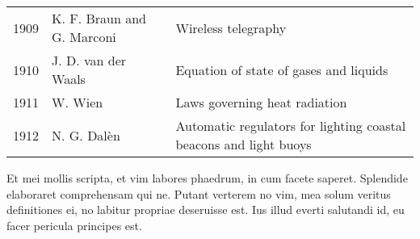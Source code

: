 \begin{landscape}
\begin{table}[hbt]
\begin{center}
\begin{tabular}{p{0.40in}p{2.30in}p{4.85in}}
        1909 & K. F. Braun and G. Marconi  & Wireless telegraphy\\
        1910 & J. D. van der Waals         & Equation of state of gases and liquids\\
        1911 & W. Wien                     & Laws governing heat radiation\\
        1912 & N. G. Dal\`{e}n             & Automatic regulators for lighting coastal beacons and light buoys\\
        \hline
      \end{tabular}
      \label{CHAPTER3_TABLE02}
    \end{center}
  \end{table}
\end{landscape}

Et mei mollis scripta, et vim labores phaedrum, in cum facete saperet. 
Splendide elaboraret comprehensam qui ne. Putant verterem no vim, mea solum 
veritus definitiones ei, no labitur propriae deseruisse est. Ius illud everti 
salutandi id, eu facer pericula principes est.

